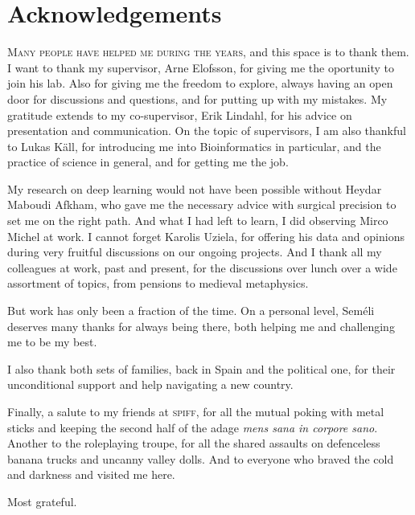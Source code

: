 \chapter*{Acknowledgements}

\lettrine[lines=3, lhang=0.15, nindent=0em]{\color{Maroon}M}{any people have helped me during the years,}
and this space is to thank them.
I want to thank my supervisor, Arne Elofsson, for giving me the oportunity to join his lab.
Also for giving me the freedom to explore, always having an open door for discussions and questions, and for putting up with my mistakes.
My gratitude extends to my co-supervisor, Erik Lindahl, for his advice on presentation and communication.
On the topic of supervisors, I am also thankful to Lukas Käll, for introducing me into Bioinformatics in particular, and the practice of science in general, and for getting me the job.

\begin{center}
    \smallskip
    \adfleafleft
    \smallskip
\end{center}

My research on deep learning would not have been possible without Heydar Maboudi Afkham, who gave me the necessary advice with surgical precision to set me on the right path.
And what I had left to learn, I did observing Mirco Michel at work.
I cannot forget Karolis Uziela, for offering his data and opinions during very fruitful discussions on our ongoing projects.
And I thank all my colleagues at work, past and present, for the discussions over lunch over a wide assortment of topics, from pensions to medieval metaphysics. 

\begin{center}
    \medskip
    \adfflowerleft
    \medskip
\end{center}

But work has only been a fraction of the time.
On a personal level, Seméli deserves many thanks for always being there, both helping me and challenging me to be my best.

I also thank both sets of families, back in Spain and the political one, for their unconditional support and help navigating a new country.

\begin{center}
    \medskip
    \adfdownleafright
    \medskip
\end{center}

Finally, a salute to my friends at \textsc{spiff}, for all the mutual poking with metal sticks and keeping the second half of the adage \emph{mens sana in corpore sano}.
Another to the roleplaying troupe, for all the shared assaults on defenceless banana trucks and uncanny valley dolls.
And to everyone who braved the cold and darkness and visited me here.

\bigskip

\raggedleft
Most grateful.



